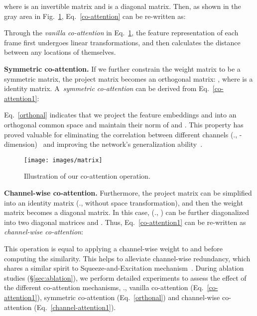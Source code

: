 \documentclass[10pt,twocolumn,letterpaper]{article}
\begin{document}
where  is an invertible matrix and  is a diagonal matrix. Then, as shown in the gray area in Fig.~\ref{fig:matrix}, Eq.~\ref{co-attention} can be re-written as:





Through the \textit{vanilla co-attention} in Eq.~\ref{fig:matrix}, the feature representation of each frame first undergoes linear transformations, and then calculates the distance between any locations of themselves.

\noindent\textbf{Symmetric co-attention.}
If we further constrain the weight matrix to be a symmetric matrix, the project matrix  becomes an orthogonal matrix: , where  is a  identity matrix. A~\textit{symmetric co-attention} can be derived from Eq.~\ref{co-attention1}:

Eq.~\ref{orthonal} indicates that we project the feature embeddings   and  into an orthogonal common space  and maintain their norm of   and . This  property has proved valuable for  eliminating the correlation between different channels (\ie., - dimension)~\cite{DBLP:conf/iccv/SunZDW17} and  improving the network's generalization ability~\cite{brock2016neural,rodriguez2016regularizing}.

\begin{figure}[t]
	\centering
	\texttt{[image: images/matrix]}
	\caption{ Illustration of our co-attention operation.  }
	\label{fig:matrix}
	\vspace{-10pt}
\end{figure}

\noindent\textbf{Channel-wise co-attention.}
Furthermore, the project matrix  can be simplified into an identity matrix  (\ie., without space transformation), and then the weight matrix  becomes a diagonal matrix. In this case,  (\ie., )  can be further diagonalized into two  diagonal matrices  and .  Thus, Eq.~\ref{co-attention1} can be re-written as \textit{channel-wise co-attention}:

This operation is equal to applying a channel-wise weight to  and   before computing the similarity. This helps to alleviate channel-wise redundancy, which shares a similar spirit to Squeeze-and-Excitation mechanism~\cite{DBLP:conf/cvpr/ChenZXNSLC17,hu2018senet}.
During ablation studies (\S\ref{sec:ablation}), we perform detailed experiments to assess the effect of the different co-attention mechanisms, \ie., vanilla co-attention (Eq.~\ref{co-attention1}), symmetric co-attention (Eq.~\ref{orthonal}) and channel-wise co-attention (Eq.~\ref{channel-attention1}).
\end{document}
